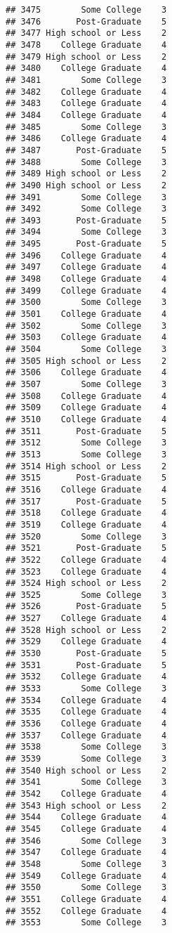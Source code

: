 \documentclass[
]{article}
\begin{document}
\begin{verbatim}
## 3475        Some College    3
## 3476       Post-Graduate    5
## 3477 High school or Less    2
## 3478    College Graduate    4
## 3479 High school or Less    2
## 3480    College Graduate    4
## 3481        Some College    3
## 3482    College Graduate    4
## 3483    College Graduate    4
## 3484    College Graduate    4
## 3485        Some College    3
## 3486    College Graduate    4
## 3487       Post-Graduate    5
## 3488        Some College    3
## 3489 High school or Less    2
## 3490 High school or Less    2
## 3491        Some College    3
## 3492        Some College    3
## 3493       Post-Graduate    5
## 3494        Some College    3
## 3495       Post-Graduate    5
## 3496    College Graduate    4
## 3497    College Graduate    4
## 3498    College Graduate    4
## 3499    College Graduate    4
## 3500        Some College    3
## 3501    College Graduate    4
## 3502        Some College    3
## 3503    College Graduate    4
## 3504        Some College    3
## 3505 High school or Less    2
## 3506    College Graduate    4
## 3507        Some College    3
## 3508    College Graduate    4
## 3509    College Graduate    4
## 3510    College Graduate    4
## 3511       Post-Graduate    5
## 3512        Some College    3
## 3513        Some College    3
## 3514 High school or Less    2
## 3515       Post-Graduate    5
## 3516    College Graduate    4
## 3517       Post-Graduate    5
## 3518    College Graduate    4
## 3519    College Graduate    4
## 3520        Some College    3
## 3521       Post-Graduate    5
## 3522    College Graduate    4
## 3523    College Graduate    4
## 3524 High school or Less    2
## 3525        Some College    3
## 3526       Post-Graduate    5
## 3527    College Graduate    4
## 3528 High school or Less    2
## 3529    College Graduate    4
## 3530       Post-Graduate    5
## 3531       Post-Graduate    5
## 3532    College Graduate    4
## 3533        Some College    3
## 3534    College Graduate    4
## 3535    College Graduate    4
## 3536    College Graduate    4
## 3537    College Graduate    4
## 3538        Some College    3
## 3539        Some College    3
## 3540 High school or Less    2
## 3541        Some College    3
## 3542    College Graduate    4
## 3543 High school or Less    2
## 3544    College Graduate    4
## 3545    College Graduate    4
## 3546        Some College    3
## 3547    College Graduate    4
## 3548        Some College    3
## 3549    College Graduate    4
## 3550        Some College    3
## 3551    College Graduate    4
## 3552    College Graduate    4
## 3553        Some College    3

\end{verbatim}
\end{document}
